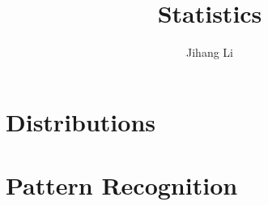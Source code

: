 \documentclass[10pt]{book}
\title{Statistics}
\author{Jihang Li}
\begin{document}
\maketitle
\tableofcontents

\part{Distributions}


\part{Pattern Recognition}

\end{document}
